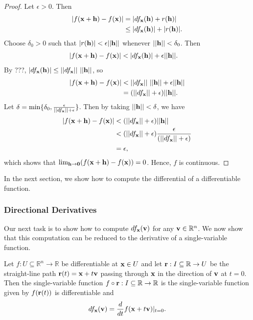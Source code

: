 \documentclass[12pt,letterpaper,reqno]{article}
\numberwithin{equation}{section}
\newcommand{\bh}{{\bf h}}
\newcommand{\R}{\ensuremath{\mathbb R}}
\newcommand{\zv}{{\bf 0}}
\newcommand{\bv}{{\bf v}}
\newcommand{\bx}{{\bf x}}
\newcommand{\bbr}{{\bf r}}
\begin{document}
{\begin{proof}
	Let $\epsilon>0$. Then
	\begin{align*}
		|f(\bx+\bh)-f(\bx)|&=|df_\bx(\bh)+r(\bh)| \\
		&\leq |df_\bx(\bh)|+|r(\bh)|.
	\end{align*}
Choose $\delta_0>0$ such that $|r(\bh)|<\epsilon ||\bh||$ whenever $||\bh||<\delta_0$. Then
\begin{align*}
	|f(\bx+\bh)-f(\bx)|&<|df_\bx(\bh)|+\epsilon ||\bh||.
\end{align*}
By ???, $|df_\bx(\bh)|\leq ||df_\bx|| \ ||\bh||$, so 
\begin{align*}
	|f(\bx+\bh)-f(\bx)|&<||df_\bx|| \ ||\bh||+\epsilon ||\bh|| \\
&=(||df_\bx|| +\epsilon)||\bh||.
\end{align*}
Let $\delta=\min\{\delta_0,\frac{\epsilon}{||df_\bx|| +\epsilon}\}$. Then by taking $||\bh||<\delta$, we have
\begin{align*}
	|f(\bx+\bh)-f(\bx)|&<(||df_\bx|| +\epsilon)||\bh|| \\
&<(||df_\bx|| +\epsilon)\frac{\epsilon}{(||df_\bx|| +\epsilon)} \\
&=\epsilon,
\end{align*}
which shows that $\lim_{\bh \to \zv} (f(\bx+\bh)-f(\bx))=0$. Hence, $f$ is continuous.
\end{proof}

In the next section, we show how to compute the differential of a differentiable function.

\subsubsection{Directional Derivatives}
Our next task is to show how to compute $df_\bx(\bv)$ for any $\bv \in \R^n$. We now show that this computation can be reduced to the derivative of a single-variable function. 

\begin{thm}\label{thm:computation_of_the_differential}
Let $f:U \subseteq \R^n \to \R$ be differentiable at $\bx \in U$ and let $\bbr: I\subseteq \R \to U$ be the straight-line path $\bbr(t)=\bx+t\bv$ passing through $\bx$ in the direction of $\bv$ at $t=0$. Then the single-variable function $f \circ \bbr :I \subseteq \R \to \R$ is the single-variable function given by $f(\bbr(t))$ is differentiable and 
\begin{align*}
	df_\bx(\bv)=\frac{d}{dt}f(\bx+t\bv)|_{t=0}.
\end{align*}	
\end{thm}

}
\end{document}
